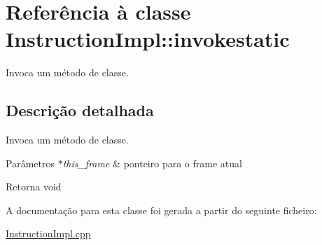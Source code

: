 \hypertarget{class_instruction_impl_1_1invokestatic}{}\section{Referência à classe Instruction\+Impl\+:\+:invokestatic}
\label{class_instruction_impl_1_1invokestatic}


Invoca um método de classe.  




\subsection{Descrição detalhada}
Invoca um método de classe. 


\begin{DoxyParams}{Parâmetros}
{\em $\ast$this\+\_\+frame} & ponteiro para o frame atual \\
\hline
\end{DoxyParams}
\begin{DoxyReturn}{Retorna}
void 
\end{DoxyReturn}


A documentação para esta classe foi gerada a partir do seguinte ficheiro\+:\begin{DoxyCompactItemize}
\item 
\hyperlink{_instruction_impl_8cpp}{Instruction\+Impl.\+cpp}\end{DoxyCompactItemize}

